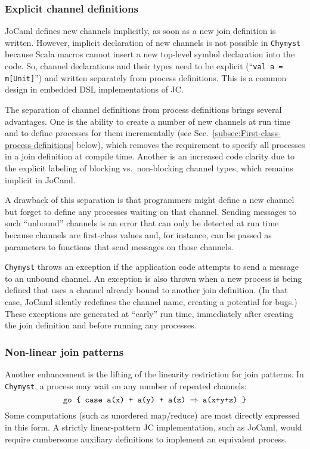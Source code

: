 \documentclass[sigplan,10pt,review,anonymous]{acmart}\settopmatter{printfolios=true}
\begin{document}
\subsubsection{Explicit channel definitions}

JoCaml defines new channels implicitly, as soon as a new join definition
is written. However, implicit declaration of new channels is not possible
in \texttt{Chymyst} because Scala macros cannot insert a new top-level
symbol declaration into the code. So, channel declarations and their
types need to be explicit (``\texttt{val a = m{[}Unit{]}}'') and
written separately from process definitions. This is a common design
in embedded DSL implementations of JC.

The separation of channel definitions from process definitions brings
several advantages. One is the ability to create a number of new channels
at run time and to define processes for them incrementally (see Sec.~\ref{subsec:First-class-process-definitions}
below), which removes the requirement to specify all processes in
a join definition at compile time. Another is an increased code clarity
due to the explicit labeling of blocking vs.~non-blocking channel
types, which remains implicit in JoCaml.

A drawback of this separation is that programmers might define a new
channel but forget to define any processes waiting on that channel.
Sending messages to such ``unbound'' channels is an error that can
only be detected at run time because channels are first-class values
and, for instance, can be passed as parameters to functions that send
messages on those channels. 

\texttt{Chymyst} throws an exception if the application code attempts
to send a message to an unbound channel. An exception is also thrown
when a new process is being defined that uses a channel already bound
to another join definition. (In that case, JoCaml silently redefines
the channel name, creating a potential for bugs.) These exceptions
are generated at ``early'' run time, immediately after creating
the join definition and before running any processes.

\subsubsection{Non-linear join patterns\label{subsec:Non-linear-join-patterns}}

Another enhancement is the lifting of the linearity restriction for
join patterns. In \texttt{Chymyst}, a process may wait on any number
of repeated channels:
\[
\text{\texttt{go \{ case a(x) + a(y) + a(z) \ensuremath{\Rightarrow} a(x+y+z) \}}}
\]
Some computations (such as unordered map/reduce) are most directly
expressed in this form. A strictly linear-pattern JC implementation,
such as JoCaml, would require cumbersome auxiliary definitions to
implement an equivalent process.
\end{document}
